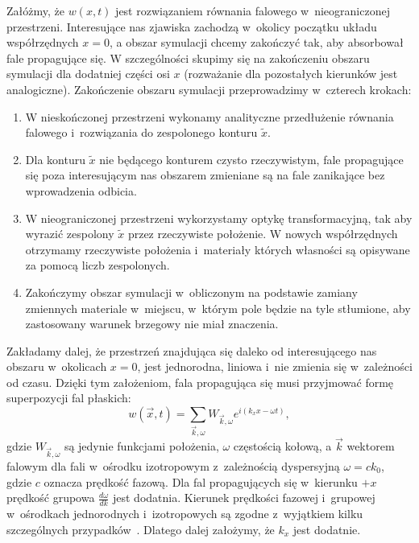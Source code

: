 Załóżmy, że $w(x,t)$ jest rozwiązaniem równania falowego w~nieograniczonej przestrzeni. Interesujące nas zjawiska zachodzą w~okolicy początku układu współrzędnych $x=0$, a obszar symulacji chcemy zakończyć tak, aby absorbował fale propagujące się. W szczególności skupimy się na zakończeniu obszaru symulacji dla dodatniej części osi $x$ (rozważanie dla pozostałych kierunków jest analogiczne). Zakończenie obszaru symulacji przeprowadzimy w~czterech krokach:
\begin{enumerate}
	\item W nieskończonej przestrzeni wykonamy analityczne przedłużenie równania falowego i~rozwiązania do zespolonego konturu $\tilde{x}$.
	\item Dla konturu $\tilde{x}$ nie będącego konturem czysto rzeczywistym, fale propagujące się poza interesującym nas obszarem zmieniane są na fale zanikające bez wprowadzenia odbicia.
	\item W nieograniczonej przestrzeni wykorzystamy optykę transformacyjną,  tak aby wyrazić zespolony $\tilde{x}$ przez rzeczywiste położenie. W nowych współrzędnych otrzymamy rzeczywiste położenia i~materiały których własności są opisywane za pomocą liczb zespolonych.
	\item Zakończymy obszar symulacji w~obliczonym na podstawie zamiany zmiennych materiale w~miejscu, w~którym pole będzie na tyle stłumione, aby zastosowany warunek brzegowy nie miał znaczenia.
\end{enumerate}

Zakładamy dalej, że przestrzeń znajdująca się daleko od interesującego nas obszaru w~okolicach $x=0$, jest jednorodna, liniowa i~nie zmienia się w~zależności od czasu. Dzięki tym założeniom, fala propagująca się musi przyjmować formę superpozycji fal płaskich:
\begin{equation}
	w(\vec{x},t)= \sum_{\vec{k},\omega} W_{\vec{k},\omega} e^{i (k_x x-\omega t)},
	\label{eq:pml-cos}
\end{equation}
gdzie $W_{\vec{k},\omega}$ są jedynie funkcjami położenia, $\omega$ częstością kołową, a $\vec{k}$ wektorem falowym dla fali w~ośrodku izotropowym z~zależnością dyspersyjną $\omega=c k_0$, gdzie $c$ oznacza prędkość fazową. Dla fal propagujących się w~kierunku $+x$ prędkość grupowa $\frac{d \omega}{d k}$ jest dodatnia. Kierunek prędkości fazowej i~grupowej w~ośrodkach jednorodnych i~izotropowych są zgodne z~wyjątkiem kilku szczególnych przypadków~\cite{teixeira1998general}. Dlatego dalej założymy, że $k_x$ jest dodatnie. 


